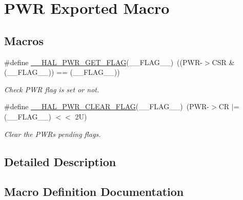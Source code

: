 \hypertarget{group___p_w_r___exported___macro}{}\section{P\+WR Exported Macro}
\label{group___p_w_r___exported___macro}
\subsection*{Macros}
\begin{DoxyCompactItemize}
\item 
\#define \hyperlink{group___p_w_r___exported___macro_ga2977135bbea35b786805eea640d1c884}{\+\_\+\+\_\+\+H\+A\+L\+\_\+\+P\+W\+R\+\_\+\+G\+E\+T\+\_\+\+F\+L\+AG}(\+\_\+\+\_\+\+F\+L\+A\+G\+\_\+\+\_\+)~((P\+WR-\/$>$C\+SR \& (\+\_\+\+\_\+\+F\+L\+A\+G\+\_\+\+\_\+)) == (\+\_\+\+\_\+\+F\+L\+A\+G\+\_\+\+\_\+))
\begin{DoxyCompactList}\small\item\em Check P\+WR flag is set or not. \end{DoxyCompactList}\item 
\#define \hyperlink{group___p_w_r___exported___macro_ga96f24bf4b16c9f944cd829100bf746e5}{\+\_\+\+\_\+\+H\+A\+L\+\_\+\+P\+W\+R\+\_\+\+C\+L\+E\+A\+R\+\_\+\+F\+L\+AG}(\+\_\+\+\_\+\+F\+L\+A\+G\+\_\+\+\_\+)~(P\+WR-\/$>$CR $\vert$=  (\+\_\+\+\_\+\+F\+L\+A\+G\+\_\+\+\_\+) $<$$<$ 2\+U)
\begin{DoxyCompactList}\small\item\em Clear the P\+WR\textquotesingle{}s pending flags. \end{DoxyCompactList}\end{DoxyCompactItemize}


\subsection{Detailed Description}


\subsection{Macro Definition Documentation}
\mbox{\label{group___p_w_r___exported___macro_ga96f24bf4b16c9f944cd829100bf746e5}} 
